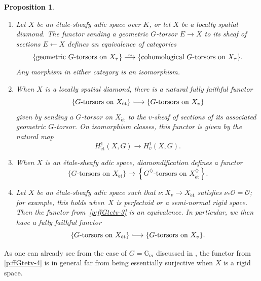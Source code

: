 \documentclass[11pt]{amsart}
\numberwithin{equation}{section}
\newtheorem{Proposition}[thm]{Proposition}
\theoremstyle{definition}
\theoremstyle{remark}
\newcommand{\lra}{\longrightarrow}
\newcommand*{\lowsim}{\vbox to 0pt{\vss\hbox{$\scriptstyle\sim$}\vskip-2pt}}
\newcommand*{\longisomarrow}{\stackrel{\lowsim}{\lra}}
\newcommand*{\longhookrightarrow}{\lhook\joinrel\longrightarrow}
\newcommand{\G}{\mathbb{G}}
\renewcommand{\O}{\mathcal{O}}
\newcommand{\et}{{\operatorname{\acute{e}t}}}
\begin{document}
\begin{Proposition}\label{p:fully-faithful-G-torsors-et-to-v}\leavevmode
	\begin{enumerate}
		\item\label{p:ffGtetv-1} Let $X$  be an \'etale-sheafy adic space over $K$, or let $X$ be a locally spatial diamond.
	The functor sending a geometric $G$-torsor $E\to X$ to its sheaf of sections $E\leftarrow X$ defines an equivalence of categories
	\[\{\text{geometric $G$-torsors on $X_{\tau}$}\}\longisomarrow\{\text{cohomological $G$-torsors on $X_{\tau}$}\}.\]
	Any morphism in either category is an isomorphism.
	\item\label{p:ffGtetv-2} When $X$ is a locally spatial diamond, there is a natural fully faithful functor
	\[ \{\text{$G$-torsors on $X_{\et}$}\}\longhookrightarrow\{\text{$G$-torsors on $X_{v}$}\}\]
	given by sending a $G$-torsor on $X_{\et}$ to the $v$-sheaf of sections of its associated geometric $G$-torsor. On isomorphism classes, this functor is given by the natural map
        \[H^1_{\et}(X,G)\lra H^1_{v}(X,G).\]
	\item\label{p:ffGtetv-3} When $X$ is an \'etale-sheafy adic space, diamondification defines a functor
	\[ \{\text{$G$-torsors on $X_{\et}$}\}\lra\left\{\text{$G^\diamondsuit$-torsors on $X_{\et}^\diamondsuit$}\right\}.\]
	\item\label{p:ffGtetv-4} Let $X$ be an \'etale-sheafy adic space such that $\nu\colon X_v\to X_\et$ satisfies $\nu_{\ast}\O=\O$; for example, this holds when~$X$ is perfectoid or a semi-normal rigid space. Then the functor from~\eqref{p:ffGtetv-3} is an equivalence. In particular, we then have a fully faithful functor
	\[\{\text{$G$-torsors on $X_{\et}$}\}\longhookrightarrow\{\text{$G$-torsors on $X_{v}$}\}.\]
	\end{enumerate}
\end{Proposition}

As one can already see  from the case of $G=\G_m$  discussed in \cite{heuer-v_lb_rigid}, the functor from \eqref{p:ffGtetv-4} is in general far from being essentially surjective when $X$ is a rigid space.
\end{document}
